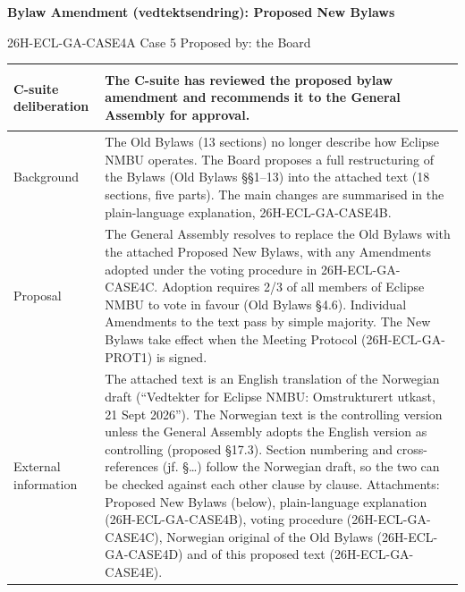 \documentclass{../../../Common/Latex/Templates/rapport}
\begin{document}
\reportmainmatter
\begingroup
\small
\setlength{\parindent}{0pt}
\setlength{\tabcolsep}{6pt}
\renewcommand{\arraystretch}{1.2}

\begin{center}
  {\Large\bfseries Bylaw Amendment (vedtektsendring): Proposed New Bylaws}\par
  \vspace{0.15cm}
  {\normalsize 26H-ECL-GA-CASE4A \textperiodcentered{} Case 5 \textperiodcentered{} Proposed by: the Board}\par
  \vspace{0.1cm}
  {\small \meetingline}\par
\end{center}

\vspace{0.3cm}
\begin{tabularx}{\textwidth}{|>{\bfseries\raggedright\arraybackslash}p{4.2cm}|X|}
  \hline
  C-suite deliberation & The C-suite has reviewed the proposed bylaw amendment and recommends it to the General Assembly for approval. \\
  \hline
  Background           & The Old Bylaws (13 sections) no longer describe how Eclipse NMBU operates. The Board proposes a full restructuring of the Bylaws (Old Bylaws \S\S1--13) into the attached text (18 sections, five parts). The main changes are summarised in the plain-language explanation, 26H-ECL-GA-CASE4B. \\
  \hline
  Proposal             & The General Assembly resolves to replace the Old Bylaws with the attached Proposed New Bylaws, with any Amendments adopted under the voting procedure in 26H-ECL-GA-CASE4C. Adoption requires 2/3 of all members of Eclipse NMBU to vote in favour (Old Bylaws \S4.6). Individual Amendments to the text pass by simple majority. The New Bylaws take effect when the Meeting Protocol (26H-ECL-GA-PROT1) is signed. \\
  \hline
  External information & The attached text is an English translation of the Norwegian draft (``Vedtekter for Eclipse NMBU: Omstrukturert utkast, 21 Sept 2026''). The Norwegian text is the controlling version unless the General Assembly adopts the English version as controlling (proposed \S17.3). Section numbering and cross-references (jf. \S\ldots) follow the Norwegian draft, so the two can be checked against each other clause by clause. Attachments: Proposed New Bylaws (below), plain-language explanation (26H-ECL-GA-CASE4B), voting procedure (26H-ECL-GA-CASE4C), Norwegian original of the Old Bylaws (26H-ECL-GA-CASE4D) and of this proposed text (26H-ECL-GA-CASE4E). \\
  \hline
\end{tabularx}
\endgroup
\end{document}
